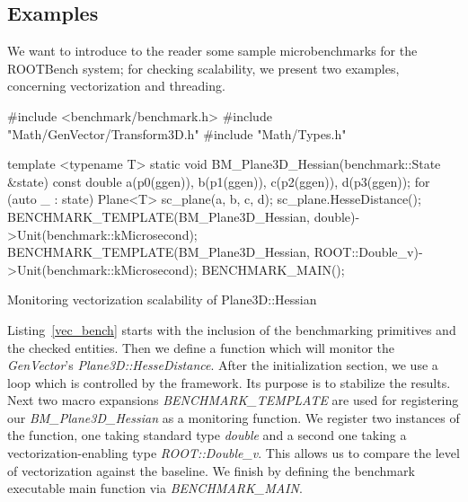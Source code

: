 \documentclass{webofc}
\begin{document}

\subsection{Examples}

We want to introduce to the reader some sample microbenchmarks for the ROOTBench system; for checking scalability, we present two examples, concerning vectorization and threading.

\begin{listing}[h]
    \noindent
    \begin{minipage}[h]{.7\textwidth}
   \begin{cppcode*}{}
  #include <benchmark/benchmark.h>
  #include "Math/GenVector/Transform3D.h"
  #include "Math/Types.h"

  template <typename T>
  static void BM_Plane3D_Hessian(benchmark::State &state) {
     const double a(p0(ggen)), b(p1(ggen)), c(p2(ggen)), d(p3(ggen));
     for (auto _ : state) {
        Plane<T> sc_plane(a, b, c, d);
        sc_plane.HesseDistance();
     }
   }
   BENCHMARK_TEMPLATE(BM_Plane3D_Hessian, double)->Unit(benchmark::kMicrosecond);
   BENCHMARK_TEMPLATE(BM_Plane3D_Hessian, ROOT::Double_v)->Unit(benchmark::kMicrosecond);
   BENCHMARK_MAIN();
   \end{cppcode*}
   \end{minipage}
   \caption{Monitoring vectorization scalability of Plane3D::Hessian}
   \label{vec_bench}
\end{listing}

Listing~\ref{vec_bench} starts with the inclusion of the benchmarking primitives and the checked entities. Then we define a function which will monitor the \textit{GenVector}'s \textit{Plane3D::HesseDistance}. After the initialization section, we use a loop which is controlled by the framework. Its purpose is to stabilize the results. Next two macro expansions \textit{BENCHMARK\_TEMPLATE} are used for registering our \textit{BM\_Plane3D\_Hessian} as a monitoring function. We register two instances of the function, one taking standard type \textit{double} and a second one taking a vectorization-enabling type \textit{ROOT::Double\_v}. This allows us to compare the level of vectorization against the baseline. We finish by defining the benchmark executable main function via \textit{BENCHMARK\_MAIN}.
\end{document}
